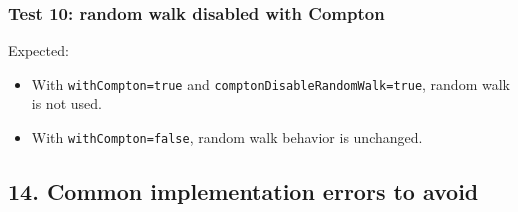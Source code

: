 \documentclass[
]{article}
\providecommand{\tightlist}{%
  \setlength{\itemsep}{0pt}\setlength{\parskip}{0pt}}
\begin{document}
\subsubsection{Test 10: random walk disabled with
Compton}\label{test-10-random-walk-disabled-with-compton}

Expected:

\begin{itemize}
\tightlist
\item
  With \texttt{withCompton=true} and
  \texttt{comptonDisableRandomWalk=true}, random walk is not used.
\item
  With \texttt{withCompton=false}, random walk behavior is unchanged.
\end{itemize}

\subsection{14. Common implementation errors to
avoid}\label{common-implementation-errors-to-avoid}
\end{document}
